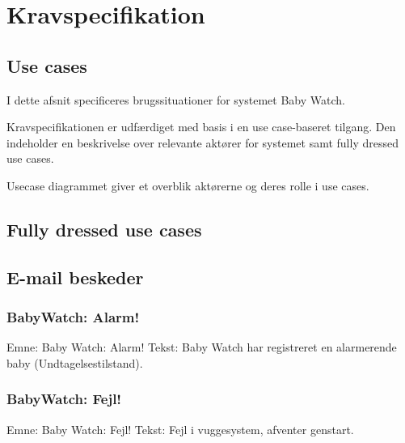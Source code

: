 \chapter{Kravspecifikation}


\section{Use cases}

I dette afsnit specificeres brugssituationer for systemet Baby Watch.

Kravspecifikationen er udfærdiget med basis i en use case-baseret tilgang. Den indeholder en beskrivelse over relevante aktører for systemet samt fully dressed use cases.


Usecase diagrammet giver et overblik aktørerne og deres rolle i use cases.


\newpage
\section{Fully dressed use cases}

\newpage

\newpage

\newpage




\section{E-mail beskeder}

\subsection*{BabyWatch: Alarm!}

Emne: Baby Watch: Alarm! \newline
Tekst: Baby Watch har registreret en alarmerende baby (Undtagelsestilstand).

\subsection*{BabyWatch: Fejl!}

Emne: Baby Watch: Fejl! \newline
Tekst: Fejl i vuggesystem, afventer genstart.



